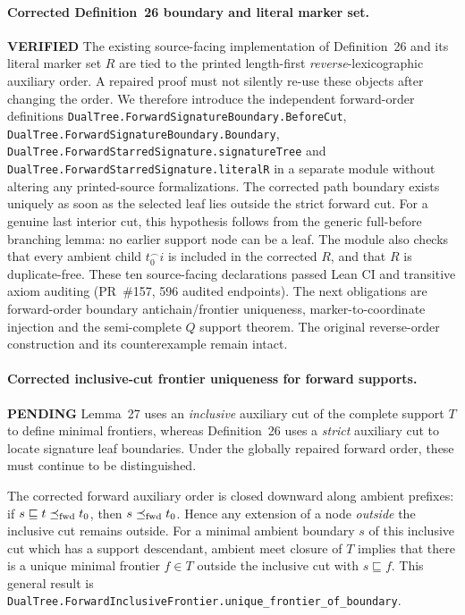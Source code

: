 \documentclass[11pt]{article}
\newcommand{\ok}{\textcolor{green!40!black}{\textbf{VERIFIED}}}
\newcommand{\todo}{\textcolor{gray!70!black}{\textbf{PENDING}}}
\newcommand{\lean}[1]{\texttt{#1}}
\begin{document}
\paragraph{Corrected Definition~26 boundary and literal marker set.} \ok
The existing source-facing implementation of
Definition~26 and its literal marker set $R$
are tied to the printed length-first
\emph{reverse}-lexicographic auxiliary order.
A repaired proof must not silently re-use
these objects after changing the order.
We therefore introduce the independent
forward-order definitions
\lean{DualTree.ForwardSignatureBoundary.BeforeCut},
\lean{DualTree.ForwardSignatureBoundary.Boundary},
\lean{DualTree.ForwardStarredSignature.signatureTree}
and
\lean{DualTree.ForwardStarredSignature.literalR}
in a separate module without altering any
printed-source formalizations.
The corrected path boundary exists uniquely
as soon as the selected leaf lies outside
the strict forward cut. For a genuine last
interior cut, this hypothesis follows from
the generic full-before branching lemma:
no earlier support node can be a leaf.
The module also checks that every ambient
child $t_0^\frown i$ is included in the
corrected $R$, and that $R$ is duplicate-free.
These ten source-facing declarations passed
Lean CI and transitive axiom auditing (PR~\#157,
596 audited endpoints).
The next obligations are forward-order
boundary antichain/frontier uniqueness,
marker-to-coordinate injection and the
semi-complete $Q$ support theorem.
The original reverse-order construction
and its counterexample remain intact.

\paragraph{Corrected inclusive-cut frontier uniqueness for forward supports.} \todo
Lemma~27 uses an \emph{inclusive} auxiliary cut
of the complete support $T$ to define minimal
frontiers, whereas Definition~26 uses a
\emph{strict} auxiliary cut to locate
signature leaf boundaries. Under the
globally repaired forward order, these
must continue to be distinguished.

The corrected forward auxiliary order is
closed downward along ambient prefixes:
if $s\sqsubseteq t\preceq_{\rm fwd}t_0$,
then $s\preceq_{\rm fwd}t_0$. Hence
any extension of a node \emph{outside}
the inclusive cut remains outside.
For a minimal ambient boundary $s$
of this inclusive cut which has a
support descendant, ambient meet
closure of $T$ implies that there
is a unique minimal frontier $f\in T$
outside the inclusive cut with
$s\sqsubseteq f$.
This general result is
\lean{DualTree.ForwardInclusiveFrontier.unique_frontier_of_boundary}.
\end{document}
